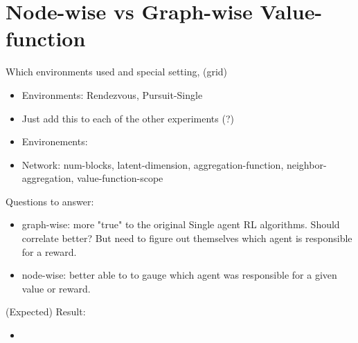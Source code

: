 \section{Node-wise vs Graph-wise Value-function}
\label{sec:Node-wise vs Graph-wise Value-function}
Which environments used and special setting, (grid)
\begin{itemize}[noitemsep,nolistsep]
    \item Environments: Rendezvous, Pursuit-Single
    \item Just add this to each of the other experiments (?)
    \item Environements: 
    \item Network: num-blocks, latent-dimension, aggregation-function, neighbor-aggregation, value-function-scope
\end{itemize}
Questions to answer:
\begin{itemize}[noitemsep,nolistsep]
    \item graph-wise: more "true" to the original Single agent RL algorithms. Should correlate better? But need to figure out themselves which agent is responsible for a reward.
    \item node-wise: better able to to gauge which agent was responsible for a given value or reward. 
\end{itemize}
(Expected) Result:
\begin{itemize}[noitemsep,nolistsep]
    \item 
\end{itemize}